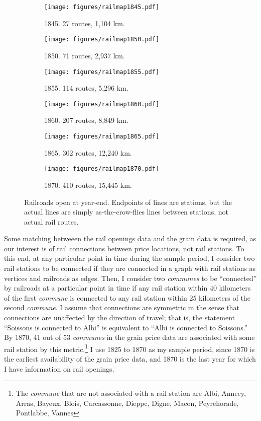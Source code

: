 \documentclass[12pt,twoside]{article}
\begin{document}
\begin{figure}[p]
	\centering
	\begin{subfigure}[t]{0.45\textwidth}
		\centering
		\caption{1845. 27 routes, 1,104 km.}
		\texttt{[image: figures/railmap1845.pdf]}
	\end{subfigure}
	\begin{subfigure}[t]{0.45\textwidth}
		\centering
		\caption{1850. 71 routes, 2,937 km.}
		\texttt{[image: figures/railmap1850.pdf]}
	\end{subfigure}
	\begin{subfigure}[t]{0.45\textwidth}
		\centering
		\caption{1855. 114 routes, 5,296 km.}
		\texttt{[image: figures/railmap1855.pdf]}
	\end{subfigure}
	\begin{subfigure}[t]{0.45\textwidth}
		\centering
		\caption{1860. 207 routes, 8,849 km.}
		\texttt{[image: figures/railmap1860.pdf]}
	\end{subfigure}
	\begin{subfigure}[t]{0.45\textwidth}
		\centering
		\caption{1865. 302 routes, 12,240 km.}
		\texttt{[image: figures/railmap1865.pdf]}
	\end{subfigure}
	\begin{subfigure}[t]{0.45\textwidth}
		\centering
		\caption{1870. 410 routes, 15,445 km.}
		\texttt{[image: figures/railmap1870.pdf]}
	\end{subfigure}
	\caption{Railroads open at year-end. Endpoints of lines are stations, but the actual lines are simply as-the-crow-flies lines between stations, not actual rail routes.}
	\label{fig:rail_openings}
\end{figure}

Some matching betweeen the rail openings data and the grain data is required, as our interest is of rail connections between price locations, not rail stations.
To this end, at any particular point in time during the sample period, I consider two rail stations to be connected if they are connected in a graph with rail stations as vertices and railroads as edges.
Then, I consider two \emph{communes} to be ``connected'' by railroads at a particular point in time if any rail station within 40 kilometers of the first \emph{commune} is connected to any rail station within 25 kilometers of the second \emph{commune}.
I assume that connections are symmetric in the sense that connections are unaffected by the direction of travel; that is, the statement ``Soissons is connected to Albi'' is equivalent to ``Albi is connected to Soissons.''
By 1870, 41 out of 53 \emph{communes} in the grain price data are associated with some rail station by this metric.\footnote{The \emph{commune} that are not associated with a rail station are Albi, Annecy, Arras, Bayeux, Blois, Carcassonne, Dieppe, Digne, Macon, Peyrehorade, Pontlabbe, Vannes}
I use 1825 to 1870 as my sample period, since 1870 is the earliest availability of the grain price data, and 1870 is the last year for which I have information on rail openings.
	
\end{document}
